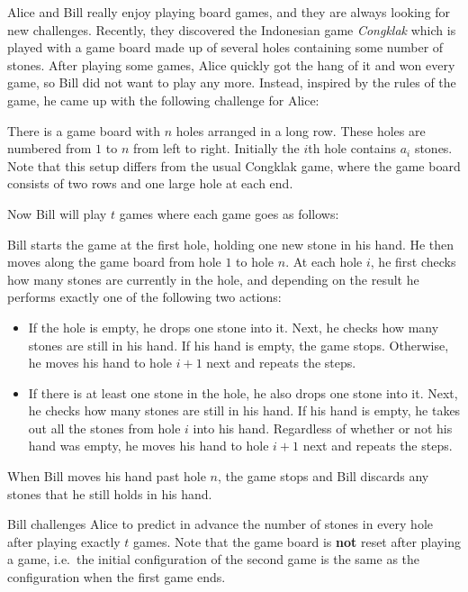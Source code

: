 
%
%
Alice and Bill really enjoy playing board games, and they are always looking for new challenges.
Recently, they discovered the Indonesian game \textit{Congklak} which is played with a game board made up of several holes containing some number of stones.
After playing some games, Alice quickly got the hang of it and won every game, so Bill did not want to play any more.
Instead, inspired by the rules of the game, he came up with the following challenge for Alice:

There is a game board with $n$ holes arranged in a long row.
These holes are numbered from $1$ to $n$ from left to right.
Initially the $i$th hole contains $a_i$ stones.
Note that this setup differs from the usual Congklak game,
where the game board consists of two rows and one large hole at each end.

Now Bill will play $t$ games where each game goes as follows:

Bill starts the game at the first hole, holding one new stone in his hand.
He then moves along the game board from hole $1$ to hole $n$.
At each hole $i$, he first checks how many stones are currently in the hole,
and depending on the result he performs exactly one of the following two actions:
\begin{itemize}
    \item[i)]
        If the hole is empty, he drops one stone into it.
        Next, he checks how many stones are still in his hand.
        If his hand is empty, the game stops.
        Otherwise, he moves his hand to hole $i+1$ next and repeats the steps.
    \item[ii)]
        If there is at least one stone in the hole, he also drops one stone into it.
        Next, he checks how many stones are still in his hand.
        If his hand is empty, he takes out all the stones from hole $i$ into his hand.
        Regardless of whether or not his hand was empty, he moves his hand to hole $i+1$ next and repeats the steps.
\end{itemize}
When Bill moves his hand past hole $n$, the game stops and Bill discards any stones that he still holds in his hand.

Bill challenges Alice to predict in advance the number of stones in every hole after playing exactly $t$ games.
Note that the game board is \textbf{not} reset after playing a game,
i.e.\ the initial configuration of the second game is the same as the configuration when the first game ends.

